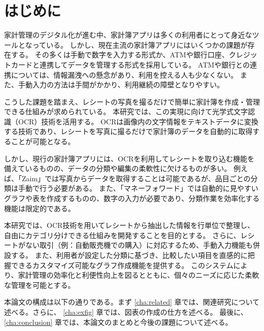 \documentclass[main]{subfiles}
\begin{document}
\chapter{はじめに}
\label{cha:intro}

家計管理のデジタル化が進む中、家計簿アプリは多くの利用者にとって身近なツールとなっている。
しかし、現在主流の家計簿アプリにはいくつかの課題が存在する。
その多くは手動で数字を入力する形式か、ATMや銀行口座、クレジットカードと連携してデータを管理する形式を採用している。
ATMや銀行との連携については、情報漏洩への懸念があり、利用を控える人も少なくない。
また、手動入力の方法は手間がかかり、利用継続の障壁となりやすい。

こうした課題を踏まえ、レシートの写真を撮るだけで簡単に家計簿を作成・管理できる仕組みが求められている。
本研究では、この実現に向けて光学式文字認識（OCR）技術を活用する。
OCRは画像内の文字情報をテキストデータに変換する技術であり、レシートを写真に撮るだけで家計簿のデータを自動的に取得することが可能となる。

しかし、現行の家計簿アプリには、OCRを利用してレシートを取り込む機能を備えているものの、データの分類や編集の柔軟性に欠けるものが多い。
例えば、「Zaim」では写真からデータを取得することは可能であるが、品目ごとの分類は手動で行う必要がある。
また、「マネーフォワード」では自動的に見やすいグラフや表を作成するものの、数字の入力が必要であり、分類作業を効率化する機能は限定的である。

本研究では、OCR技術を用いてレシートから抽出した情報を行単位で整理し、自由にカテゴリ分けできる仕組みを開発することを目的とする。
さらに、レシートがない取引（例：自動販売機での購入）に対応するため、手動入力機能も併設する。
また、利用者が設定した分類に基づき、比較したい項目を直感的に把握できるカスタマイズ可能なグラフ作成機能を提供する。
このシステムにより、家計管理の効率化と利便性向上を図るとともに、個々のニーズに応じた柔軟な管理を可能とする。

本論文の構成は以下の通りである。まず \ref{cha:related} 章では、関連研究について述べる。さらに、
\ref{cha:exfig} 章では、図表の作成の仕方を述べる。
最後に、\ref{cha:conclusion} 章では、本論文のまとめと今後の課題について述べる。
\end{document}
